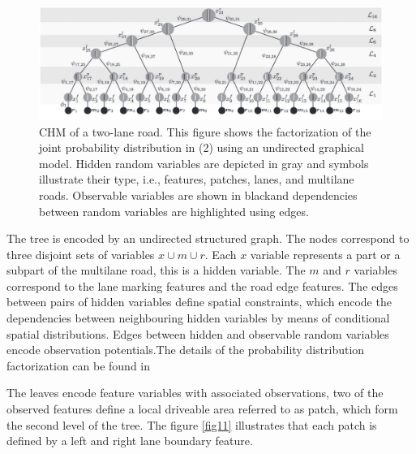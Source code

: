 \begin{figure}[H]
	\centering
    \includegraphics[scale = 0.3]{pictures/tree.pdf}
	\caption{CHM of a two-lane road. This figure shows the factorization of the joint probability distribution in (2) using an undirected graphical model. Hidden random variables are depicted in gray and symbols illustrate their type, i.e., features, patches, lanes, and multilane roads. Observable variables are shown in blackand dependencies between random variables are highlighted using edges. \cite{lanesystem}}
	\label{fig10}
\end{figure}


The tree is encoded by an undirected structured graph. The nodes correspond to three disjoint sets of variables $x \cup m \cup r$.  Each $x$ variable represents a part or a subpart of the multilane road, this is a hidden variable. The $m$ and $r$ variables correspond to the lane marking features and the road edge features. The edges between pairs of hidden variables define spatial constraints, which encode the dependencies between neighbouring hidden variables by means of conditional spatial distributions. Edges between hidden and observable random variables encode observation potentials.The details of the probability distribution factorization can be found in \cite{lanesystem}

The leaves encode feature variables with associated observations, two of the observed features define a local driveable area referred to as patch, which form the second level of the tree. The figure \ref{fig11} illustrates that each patch is defined by a left and right lane boundary feature.

